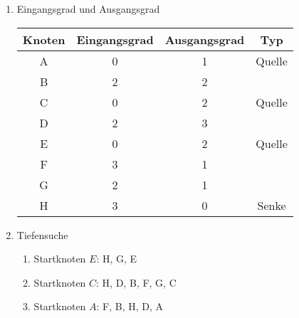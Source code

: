 \documentclass[12pt]{scrartcl}
\begin{document}
\begin{enumerate}
  \item Eingangsgrad und Ausgangsgrad
  \begin{center}
    \begin{tabular}{ |c|c|c|c| } 
     \hline
     Knoten & Eingangsgrad & Ausgangsgrad & Typ\\ \hline
     A & 0 & 1 & Quelle\\ \hline
     B & 2 & 2 & \\ \hline
     C & 0 & 2 & Quelle\\ \hline
     D & 2 & 3 & \\ \hline
     E & 0 & 2 & Quelle\\ \hline
     F & 3 & 1 & \\ \hline
     G & 2 & 1 & \\ \hline
     H & 3 & 0 & Senke\\
     \hline
    \end{tabular}
  \end{center}
  
  \item Tiefensuche
  \begin{enumerate}
    \item Startknoten $E$: H, G, E
    \item Startknoten $C$: H, D, B, F, G, C
    \item Startknoten $A$: F, B, H, D, A
  \end{enumerate} 

\end{enumerate}
\end{document}

